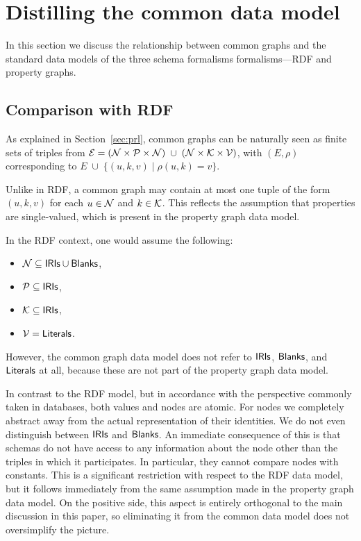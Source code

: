 \section{Distilling the common data model}
\label{sec:appendix-foundations}


In this section we discuss the relationship between common graphs and the standard data models of the three schema formalisms formalisms---RDF and property graphs. 


\subsection{Comparison with RDF}
\label{app:sec-foundations-comparison-rdf}

As explained in Section~\ref{sec:prl}, common graphs can be naturally seen as finite sets of triples from 
$\mathcal{E} = \left(\mathcal{N}\times\mathcal{P}\times\mathcal{N}\right) \;\cup\; \left(\mathcal{N}\times\mathcal{K}\times\mathcal{V}\right)$, with  $(E,\rho)$ corresponding to 
$E \;\cup\; \{(u,k,v) \mid \rho(u,k) = v\}$. 

Unlike in RDF, a common graph may contain at most one tuple of the form $(u,k,v)$ for each $u\in \mathcal{N}$ and $k\in\mathcal{K}$. This reflects the assumption that  properties are single-valued, which is present in the property graph data model. 

In the RDF context, one would assume the following:
\begin{itemize}
\item $\mathcal{N} \subseteq \mathsf{IRIs} \cup \mathsf{Blanks}$,
\item $\mathcal{P} \subseteq \mathsf{IRIs}$, 
\item $\mathcal{K} \subseteq \mathsf{IRIs}$,
\item $\mathcal{V} = \mathsf{Literals}$.
\end{itemize}
However, the common graph data model does not refer to $\mathsf{IRIs}$, $\mathsf{Blanks}$, and $\mathsf{Literals}$ at all, because these are not part of the property graph data model. 

In contrast to the RDF model, but in accordance with the perspective commonly taken in databases, both values and nodes are atomic. For nodes we completely abstract away from the actual representation of their identities. We do not even distinguish between $\mathsf{IRIs}$ and $\mathsf{Blanks}$. An immediate consequence of this is that schemas do not have access to any information about the node other than the triples in which it participates. In particular, they cannot compare nodes with constants. This is a significant restriction with respect to the RDF data model, but it follows immediately from the same assumption made in the property graph data model. On the positive side, this aspect is entirely orthogonal to the main discussion in this paper, so eliminating it from the common data model does not oversimplify the picture. 

